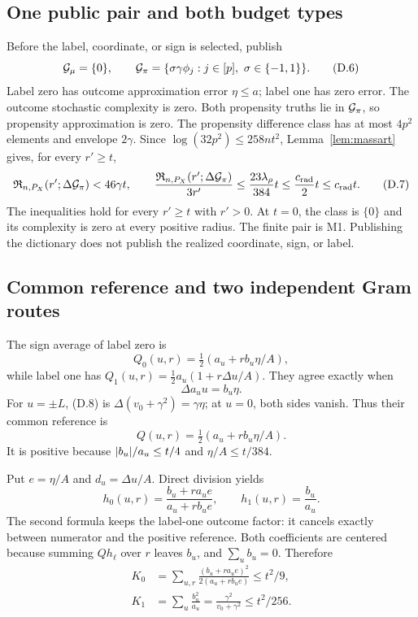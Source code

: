 \subsection{One public pair and both budget types}

Before the label, coordinate, or sign is selected, publish
\[
 \mathcal G_\mu=\{0\},\qquad
 \mathcal G_\pi=\{\sigma\gamma\phi_j:j\in[p],\ \sigma\in\{-1,1\}\}.
 \tag{D.6}
\]
Label zero has outcome approximation error \(\eta\le a\); label one has
zero error.  The outcome stochastic complexity is zero.  Both propensity
truths lie in \(\mathcal G_\pi\), so propensity approximation is zero.  The
propensity difference class has at most \(4p^2\) elements and envelope
\(2\gamma\).  Since \(\log(32p^2)\le258nt^2\), Lemma~\ref{lem:massart}
gives, for every \(r'\ge t\),
\[
 \mathfrak R_{n,P_X}(r';\Delta\mathcal G_\pi)
 <46\gamma t,\qquad
 \frac{\mathfrak R_{n,P_X}(r';\Delta\mathcal G_\pi)}{3r'}
 \le\frac{23\lambda_\rho}{384}t
 \le\frac{c_{\rm rad}}2t\le c_{\rm rad}t.
 \tag{D.7}
\]
The inequalities hold for every \(r'\ge t\) with \(r'>0\).  At \(t=0\),
the class is \(\{0\}\) and its complexity is zero at every positive radius.
The finite pair is M1.  Publishing the dictionary does not publish the
realized coordinate, sign, or label.

\subsection{Common reference and two independent Gram routes}

The sign average of label zero is
\[
 Q_0(u,r)=\tfrac12(a_u+rb_u\eta/A),
\]
while label one has
\(Q_1(u,r)=\tfrac12a_u(1+r\Delta u/A)\).  They agree exactly when
\[
 \Delta a_uu=b_u\eta.
 \tag{D.8}
\]
For \(u=\pm L\), (D.8) is
\(\Delta(v_0+\gamma^2)=\gamma\eta\); at \(u=0\), both sides vanish.
Thus their common reference is
\[
 Q(u,r)=\tfrac12(a_u+rb_u\eta/A).
 \tag{D.9}
\]
It is positive because
\(\lvert b_u\rvert/a_u\le t/4\) and \(\eta/A\le t/384\).

Put \(e=\eta/A\) and \(d_u=\Delta u/A\).  Direct division yields
\[
 h_0(u,r)=\frac{b_u+ra_ue}{a_u+rb_ue},\qquad
 h_1(u,r)=\frac{b_u}{a_u}.
 \tag{D.10}
\]
The second formula keeps the label-one outcome factor: it cancels exactly
between numerator and the positive reference.  Both coefficients are
centered because summing \(Qh_\ell\) over \(r\) leaves \(b_u\), and
\(\sum_ub_u=0\).  Therefore
\begin{align}
 K_0&=\sum_{u,r}\frac{(b_u+ra_ue)^2}{2(a_u+rb_ue)}
 \le t^2/9,\nonumber\\
 K_1&=\sum_u\frac{b_u^2}{a_u}
 =\frac{\gamma^2}{v_0+\gamma^2}\le t^2/256.
 \tag{D.11}
\end{align}

